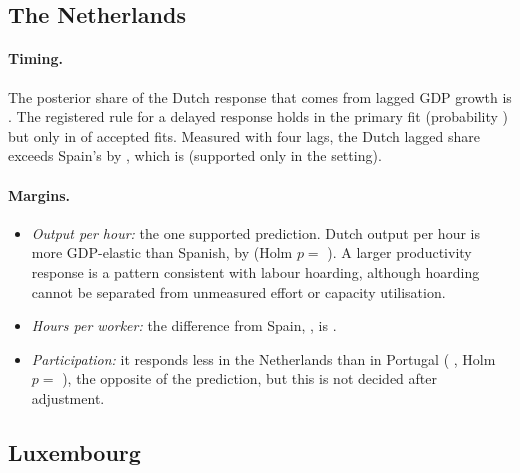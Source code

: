 \subsection{The Netherlands}

\paragraph{Timing.} The posterior share of the Dutch response that comes from lagged GDP
growth is . The registered rule for a delayed response holds in the
primary fit (probability ) but only in  of
 accepted fits. Measured with four lags, the Dutch lagged share exceeds
Spain's by  , which is  (supported only
in the  setting).

\paragraph{Margins.}
\begin{itemize}
  \item \emph{Output per hour:} the one supported prediction. Dutch output per hour is
    more GDP-elastic than Spanish, by   (Holm $p=$
    ). A larger productivity response is a pattern consistent with labour
    hoarding, although hoarding cannot be separated from unmeasured effort or capacity
    utilisation.
  \item \emph{Hours per worker:} the difference from Spain,  ,
    is .
  \item \emph{Participation:} it responds less in the Netherlands than in Portugal
    ( , Holm $p=$ ), the opposite of the
    prediction, but this is not decided after adjustment.
\end{itemize}

\subsection{Luxembourg}

